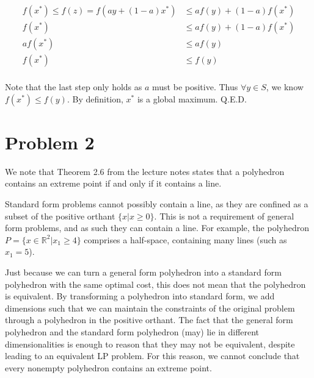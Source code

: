 \documentclass[11pt]{article}
\begin{document}
\begin{equation}
\begin{split}
f(x^*)\leq f(z) = f(ay + (1-a)x^*) &\leq af(y) + (1-a) f(x^*)\\
f(x^*) &\leq af(y) + (1-a) f(x^*) \\
af(x^*) &\leq af(y) \\
f(x^*) &\leq f(y) \\
\end{split}
\end{equation}

Note that the last step only holds as $a$ must be positive. Thus $\forall y\in S$, we know $f(x^*)\leq f(y)$. By definition, $x^*$ is a global maximum. Q.E.D. 

\section*{Problem 2}

We note that Theorem 2.6 from the lecture notes states that a polyhedron contains an extreme point if and only if it contains a line.

Standard form problems cannot possibly contain a line, as they are confined as a subset of the positive orthant $\{x|x\geq 0\}$. This is not a requirement of general form problems, and as such they can contain a line. For example, the polyhedron $P=\{x\in\mathbb{R}^2|x_1\geq 4\}$ comprises a half-space, containing many lines (such as $x_1=5$).

Just because we can turn a general form polyhedron into a standard form polyhedron with the same optimal cost, this does not mean that the polyhedron is equivalent. By transforming a polyhedron into standard form, we add dimensions such that we can maintain the constraints of the original problem through a polyhedron in the positive orthant. The fact that the general form polyhedron and the standard form polyhedron (may) lie in different dimensionalities is enough to reason that they may not be equivalent, despite leading to an equivalent LP problem. For this reason, we cannot conclude that every nonempty polyhedron contains an extreme point.
\end{document}
